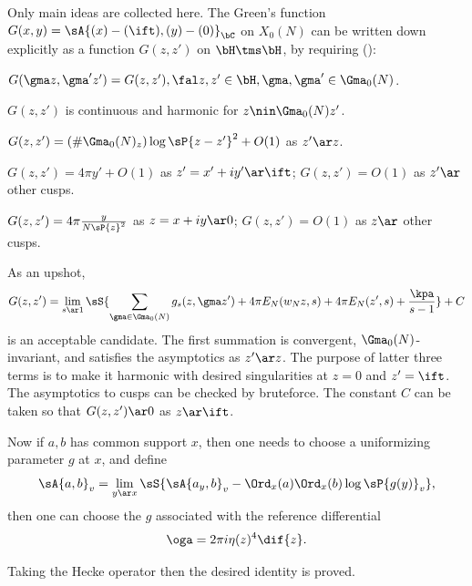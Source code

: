 \documentclass[a4paper, twoside]{article}
\begin{document}
\begin{prf}
	Only main ideas are collected here. The Green's function $G(x,y)=\sA{(x)-(\ift),(y)-(0)}_{\bC}$ on $X_{0}(N)$ can be written down explicitly as a function $G(z,z')$ on $\bH\tms\bH$, by requiring (\cite[II.2.3]{GZ1986}):
	\begin{enr}
		\item $G(\gma z,\gma'z')=G(z,z'), \fal z,z'\in\bH, \gma,\gma'\in\Gma_{0}(N)$.
		\item $G(z,z')$ is continuous and harmonic for $z\nin\Gma_{0}(N)z'$.
		\item $G(z,z')=(\#\Gma_{0}(N)_{z})\log\sP{z-z'}^{2}+O(1)$ as $z'\ar z$.
		\item $G(z,z')=4\pi y'+O(1)$ as $z'=x'+iy'\ar\ift$; $G(z,z')=O(1)$ as $z'\ar$ other cusps.
		\item $G(z,z')=4\pi\frac{y}{N\sP{z}^{2}}$ as $z=x+iy\ar0$; $G(z,z')=O(1)$ as $z\ar$ other cusps.
	\end{enr}
	As an upshot,
	\[
		G(z,z')=\lim_{s\ar1}\sS{\sum_{\gma\in\Gma_{0}(N)}g_{s}(z,\gma z')+4\pi E_{N}(w_{N}z,s)+4\pi E_{N}(z',s)+\frac{\kpa}{s-1}}+C
	\]
	is an acceptable candidate. The first summation is convergent, $\Gma_{0}(N)$-invariant, and satisfies the asymptotics as $z'\ar z$. The purpose of latter three terms is to make it harmonic with desired singularities at $z=0$ and $z'=\ift$. The asymptotics to cusps can be checked by bruteforce. The constant $C$ can be taken so that $G(z,z')\ar 0$ as $z\ar \ift$.


	Now if $a,b$ has common support $x$, then one needs to choose a uniformizing parameter $g$ at $x$, and define
	\[
		\sA{a,b}_{v}=\lim_{y\ar x}\sS{\sA{a_{y},b}_{v}-\Ord_{x}(a)\Ord_{x}(b)\log\sP{g(y)}_{v}},
	\]
	then one can choose the $g$ associated with the reference differential
	\[
		\oga=2\pi i\eta(z)^{4}\dif{z}.
	\]

	Taking the Hecke operator then the desired identity is proved.
\end{prf}

\end{document}
